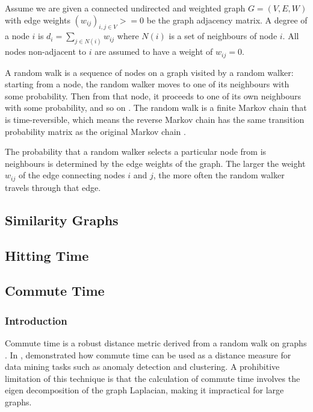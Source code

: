 Assume we are given a connected undirected and weighted graph $G=(V,E,W)$ with
edge weights $(w_{ij})_{i,j \in V}>=0$ be the graph adjacency matrix. A degree
of a node $i$ is $d_i=\sum_{j\in N(i)}w_{ij}$ where $N(i)$ is a set of
neighbours of node $i$. All nodes non-adjacent to $i$ are assumed to have a
weight of $w_{ij}=0$.

A random walk is a sequence of nodes on a graph visited by a random walker:
starting from a node, the random walker moves to one of its neighbours with some
probability. Then from that node, it proceeds to one of its own neighbours with
some probability, and so on \cite{Khoa:2012}. The random walk is a finite Markov
chain that is time-reversible, which means the reverse Markov chain has the same
transition probability matrix as the original Markov chain \cite{Lovasz:1996}.

The probability that a random walker selects a particular node from is
neighbours is determined by the edge weights of the graph. The larger the weight
$w_{ij}$ of the edge connecting nodes $i$ and $j$, the more often the random
walker travels through that edge.

\subsection{Similarity Graphs}
\label{similarityGraphs}

\subsection{Hitting Time}
\label{hittingTime}

\subsection{Commute Time}
\label{commuteTime}

\subsubsection{Introduction}
\label{commuteTime:introduction}
Commute time is a robust distance metric derived from a random walk on graphs
\cite{Khoa:2012}. In , \citeauthor{Khoa:2012} demonstrated
how commute time can be used as a distance measure for data mining tasks such as
anomaly detection and clustering. A prohibitive limitation of this technique is
that the calculation of commute time involves the eigen decomposition of the
graph Laplacian, making it impractical for large graphs.

